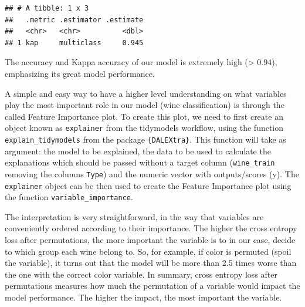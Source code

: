 \documentclass[
]{krantz}
\makeatletter
\newenvironment{Shaded}{\begin{snugshade}}{\end{snugshade}}
\newcommand{\AttributeTok}[1]{\textcolor[rgb]{0.61,0.61,0.61}{#1}}
\newcommand{\FunctionTok}[1]{\textcolor[rgb]{0,0,0}{#1}}
\newcommand{\NormalTok}[1]{#1}
\newcommand{\OtherTok}[1]{\textcolor[rgb]{0.37,0.37,0.37}{#1}}
\newcommand{\SpecialCharTok}[1]{\textcolor[rgb]{0,0,0}{#1}}
\newcommand{\StringTok}[1]{\textcolor[rgb]{0.5,0.5,0.5}{#1}}
\newenvironment{kframe}{%
\medskip{}
\setlength{\fboxsep}{.8em}
 \def\at@end@of@kframe{}%
 \ifinner\ifhmode%
  \def\at@end@of@kframe{\end{minipage}}%
  \begin{minipage}{\columnwidth}%
 \fi\fi%
 \def\FrameCommand##1{\hskip\@totalleftmargin \hskip-\fboxsep
 \colorbox{shadecolor}{##1}\hskip-\fboxsep
     \hskip-\linewidth \hskip-\@totalleftmargin \hskip\columnwidth}%
 \MakeFramed {\advance\hsize-\width
   \@totalleftmargin\z@ \linewidth\hsize
   \@setminipage}}%
 {\par\unskip\endMakeFramed%
 \at@end@of@kframe}
\renewenvironment{Shaded}{\begin{kframe}}{\end{kframe}}
\makeatother
\begin{document}
\begin{verbatim}
## # A tibble: 1 x 3
##   .metric .estimator .estimate
##   <chr>   <chr>          <dbl>
## 1 kap     multiclass     0.945
\end{verbatim}

The accuracy and Kappa accuracy of our model is extremely high (\textgreater{} 0.94), emphasizing its great model performance.

A simple and easy way to have a higher level understanding on what variables play the most important role in our model (wine classification) is through the called Feature Importance plot. To create this plot, we need to first create an object known as \texttt{explainer} from the tidymodels workflow, using the function \texttt{explain\_tidymodels} from the package \texttt{\{DALEXtra\}}. This function will take as argument: the model to be explained, the data to be used to calculate the explanations which should be passed without a target column (\texttt{wine\_train} removing the columns \texttt{Type}) and the numeric vector with outputs/scores (y). The \texttt{explainer} object can be then used to create the Feature Importance plot using the function \texttt{variable\_importance}.

The interpretation is very straightforward, in the way that variables are conveniently ordered according to their importance. The higher the cross entropy loss after permutations, the more important the variable is to in our case, decide to which group each wine belong to. So, for example, if color is permuted (spoil the variable), it turns out that the model will be more than 2.5 times worse than the one with the correct color variable. In summary, cross entropy loss after permutations measures how much the permutation of a variable would impact the model performance. The higher the impact, the most important the variable.

\begin{Shaded}
\end{Shaded}
\end{document}
